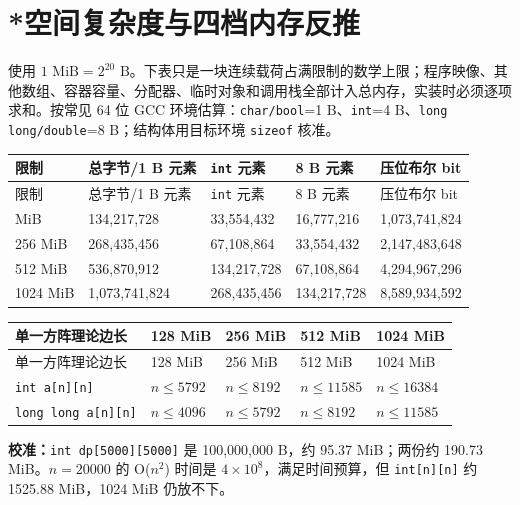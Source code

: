 \documentclass[a4paper,11pt]{article}
\newcommand{\code}[1]{\texttt{#1}}
\begin{document}
\section{*空间复杂度与四档内存反推}

使用 $1\text{ MiB}=2^{20}\text{ B}$。下表只是一块连续载荷占满限制的数学上限；程序映像、其他数组、容器容量、分配器、临时对象和调用栈全部计入总内存，实装时必须逐项求和。按常见 64 位 GCC 环境估算：\code{char/bool}=1 B、\code{int}=4 B、\code{long long/double}=8 B；结构体用目标环境 \code{sizeof} 核准。

\begingroup
\small
\begin{longtable}{L{2.5cm} R{3.3cm} R{3.3cm} R{3.3cm} R{3.3cm}}
\toprule
限制 & 总字节/1 B 元素 & \code{int} 元素 & 8 B 元素 & 压位布尔 bit \\
\midrule
\endfirsthead
\toprule
限制 & 总字节/1 B 元素 & \code{int} 元素 & 8 B 元素 & 压位布尔 bit \\
\midrule
\endhead
\endfoot
\bottomrule
{} MiB & 134,217,728 & 33,554,432 & 16,777,216 & 1,073,741,824 \\[1.2mm]
256 MiB & 268,435,456 & 67,108,864 & 33,554,432 & 2,147,483,648 \\[1.2mm]
512 MiB & 536,870,912 & 134,217,728 & 67,108,864 & 4,294,967,296 \\[1.2mm]
1024 MiB & 1,073,741,824 & 268,435,456 & 134,217,728 & 8,589,934,592 \\
\end{longtable}

\begin{longtable}{L{3.8cm} C{3.1cm} C{3.1cm} C{3.1cm} C{3.1cm}}
\toprule
单一方阵理论边长 & 128 MiB & 256 MiB & 512 MiB & 1024 MiB \\
\midrule
\endfirsthead
\toprule
单一方阵理论边长 & 128 MiB & 256 MiB & 512 MiB & 1024 MiB \\
\midrule
\endhead
\endfoot
\bottomrule
\endlastfoot
\code{int a[n][n]} & $n\le5792$ & $n\le8192$ & $n\le11585$ & $n\le16384$ \\[1.2mm]
\code{long long a[n][n]} & $n\le4096$ & $n\le5792$ & $n\le8192$ & $n\le11585$ \\
\end{longtable}
\endgroup

\textbf{校准：}\code{int dp[5000][5000]} 是 100,000,000 B，约 95.37 MiB；两份约 190.73 MiB。$n=20000$ 的 O($n^2$) 时间是 $4\times10^8$，满足时间预算，但 \code{int[n][n]} 约 1525.88 MiB，1024 MiB 仍放不下。
\end{document}
